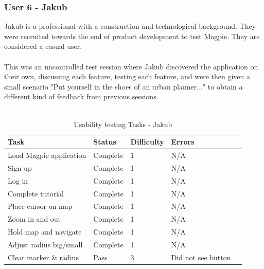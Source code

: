 \subsubsection{User 6 - Jakub}
Jakub is a professional with a construction and technological background. They were recruited towards the end of product development to test Magpie. They are considered a casual user.\\\\
This was an uncontrolled test session where Jakub discovered the application on their own, discussing each feature, testing each feature, and were then given a small scenario "Put yourself in the shoes of an urban planner..." to obtain a different kind of feedback from previous sessions.\\\\
\begin{table}[h!]
    \centering
    \caption{Usability testing Tasks - Jakub}
    \begin{tabular}{|p{}|p{}|p{}|p{}|p{}|}
        \hline
        \textbf{Task}                 & \textbf{Status} & \textbf{Difficulty} & \textbf{Errors}    \\
        \hline
        Load Magpie application       & Complete        & 1                   & N/A                \\
        \hline
        Sign up                       & Complete        & 1                   & N/A                \\
        \hline
        Log in                        & Complete        & 1                   & N/A                \\
        \hline
        Complete tutorial             & Complete        & 1                   & N/A                \\
        \hline
        Place cursor on map           & Complete        & 1                   & N/A                \\
        \hline
        Zoom in and out               & Complete        & 1                   & N/A                \\
        \hline
        Hold map and navigate         & Complete        & 1                   & N/A                \\
        \hline
        Adjust radius big/small       & Complete        & 1                   & N/A                \\
        \hline
        Clear marker \& radius        & Pass            & 3                   & Did not see button \\

\end{tabular}
\end{table}
